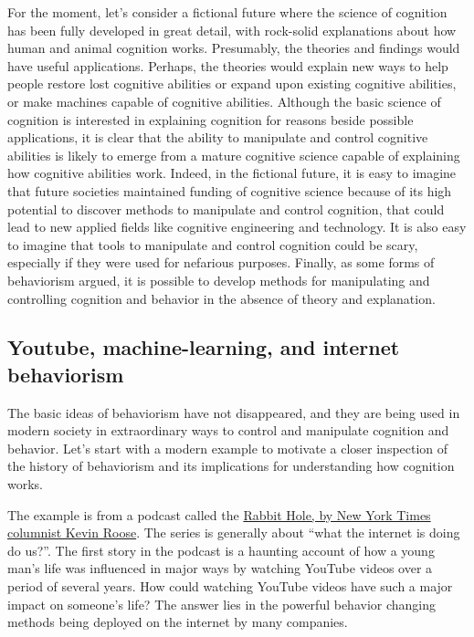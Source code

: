\documentclass[
  oneside,
  12pt]{crumpbook}
\begin{document}
For the moment, let's consider a fictional future where the science of cognition has been fully developed in great detail, with rock-solid explanations about how human and animal cognition works. Presumably, the theories and findings would have useful applications. Perhaps, the theories would explain new ways to help people restore lost cognitive abilities or expand upon existing cognitive abilities, or make machines capable of cognitive abilities. Although the basic science of cognition is interested in explaining cognition for reasons beside possible applications, it is clear that the ability to manipulate and control cognitive abilities is likely to emerge from a mature cognitive science capable of explaining how cognitive abilities work. Indeed, in the fictional future, it is easy to imagine that future societies maintained funding of cognitive science because of its high potential to discover methods to manipulate and control cognition, that could lead to new applied fields like cognitive engineering and technology. It is also easy to imagine that tools to manipulate and control cognition could be scary, especially if they were used for nefarious purposes. Finally, as some forms of behaviorism argued, it is possible to develop methods for manipulating and controlling cognition and behavior in the absence of theory and explanation.

\hypertarget{youtube-machine-learning-and-internet-behaviorism}{%
\subsection{Youtube, machine-learning, and internet behaviorism}\label{youtube-machine-learning-and-internet-behaviorism}}

The basic ideas of behaviorism have not disappeared, and they are being used in modern society in extraordinary ways to control and manipulate cognition and behavior. Let's start with a modern example to motivate a closer inspection of the history of behaviorism and its implications for understanding how cognition works.

The example is from a podcast called the \href{https://www.nytimes.com/column/rabbit-hole}{Rabbit Hole, by New York Times columnist Kevin Roose}. The series is generally about ``what the internet is doing do us?''. The first story in the podcast is a haunting account of how a young man's life was influenced in major ways by watching YouTube videos over a period of several years. How could watching YouTube videos have such a major impact on someone's life? The answer lies in the powerful behavior changing methods being deployed on the internet by many companies.
\end{document}
